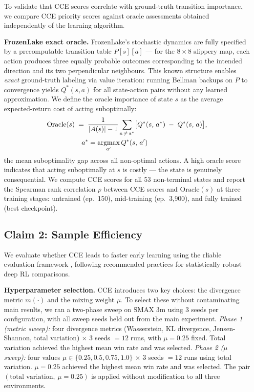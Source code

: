 \documentclass[conference]{IEEEtran}
\newcommand{\argmax}{\operatornamewithlimits{argmax}}
\begin{document}
\noindent To validate that CCE scores correlate with ground-truth transition importance, we compare CCE priority scores against oracle assessments obtained independently of the learning algorithm.

\textbf{FrozenLake exact oracle.}
FrozenLake's stochastic dynamics are fully specified by a precomputable transition table $P[s][a]$ — for the $8\times8$ slippery map, each action produces three equally probable outcomes corresponding to the intended direction and its two perpendicular neighbours.
This known structure enables \emph{exact} ground-truth labeling via value iteration: running Bellman backups on $P$ to convergence yields $Q^*(s,a)$ for all state-action pairs without any learned approximation.
We define the oracle importance of state $s$ as the average expected-return cost of acting suboptimally:
\begin{equation}
\begin{split}
  \text{Oracle}(s) &\;=\; \frac{1}{|A(s)|-1} \sum_{a \,\neq\, a^*} \bigl[Q^*(s,\, a^*) \;-\; Q^*(s,\, a)\bigr], \\
  &\quad a^* = \argmax_{a'} Q^*(s,\, a')
\end{split}
  \label{eqn:oracle}
\end{equation}
the mean suboptimality gap across all non-optimal actions.
A high oracle score indicates that acting suboptimally at $s$ is costly — the state is genuinely consequential.
We compute CCE scores for all 53 non-terminal states and report the Spearman rank correlation $\rho$ between CCE scores and $\text{Oracle}(s)$ at three training stages: untrained (ep.\ 150), mid-training (ep.\ 3{,}900), and fully trained (best checkpoint).

\subsection{Claim 2: Sample Efficiency}

\noindent We evaluate whether CCE leads to faster early learning using the rliable evaluation framework \cite{agarwal2021deep}, following recommended practices for statistically robust deep RL comparisons.

\textbf{Hyperparameter selection.} CCE introduces two key choices: the divergence metric $m(\cdot)$ and the mixing weight $\mu$. To select these without contaminating main results, we ran a two-phase sweep on SMAX 3m using 3 seeds per configuration, with all sweep seeds held out from the main experiment. \emph{Phase 1 (metric sweep):} four divergence metrics (Wasserstein, KL divergence, Jensen-Shannon, total variation) $\times$ 3 seeds $= 12$ runs, with $\mu = 0.25$ fixed. Total variation achieved the highest mean win rate and was selected. \emph{Phase 2 ($\mu$ sweep):} four values $\mu \in \{0.25, 0.5, 0.75, 1.0\}$ $\times$ 3 seeds $= 12$ runs using total variation. $\mu = 0.25$ achieved the highest mean win rate and was selected. The pair $(\text{total variation},\ \mu{=}0.25)$ is applied without modification to all three environments.
\end{document}
